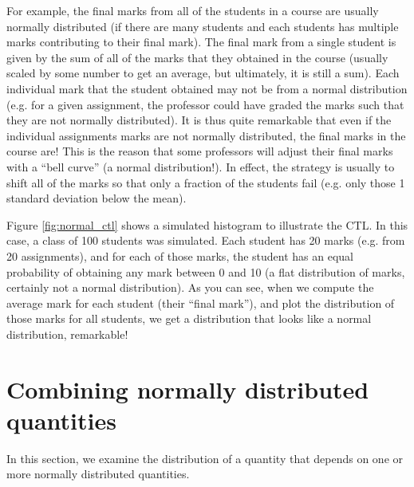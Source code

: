  For example, the final marks from all of the students in a course are usually normally distributed (if there are many students and each students has multiple marks contributing to their final mark). The final mark from a single student is given by the sum of all of the marks that they obtained in the course (usually scaled by some number to get an average, but ultimately, it is still a sum). Each individual mark that the student obtained may not be from a normal distribution (e.g. for a given assignment, the professor could have graded the marks such that they are not normally distributed). It is thus quite remarkable that even if the individual assignments marks are not normally distributed, the final marks in the course are! This is the reason that some professors will adjust their final marks with a ``bell curve'' (a normal distribution!). In effect, the strategy is usually to shift all of the marks so that only a fraction of the students fail (e.g. only those 1 standard deviation below the mean). 
 
Figure \ref{fig:normal_ctl} shows a simulated histogram to illustrate the CTL. In this case, a class of 100 students was simulated. Each student has 20 marks (e.g. from 20 assignments), and for each of those marks, the student has an equal probability of obtaining any mark between 0 and 10 (a flat distribution of marks, certainly not a normal distribution). As you can see, when we compute the average mark for each student (their ``final mark''), and plot the distribution of those marks for all students, we get a distribution that looks like a normal distribution, remarkable!
 

\section{Combining normally distributed quantities}
In this section, we examine the distribution of a quantity that depends on one or more normally distributed quantities.

